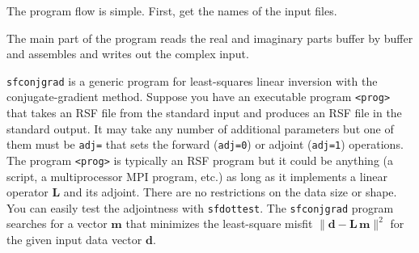 The program flow is simple. First, get the names of the input files.

The main part of the program reads the real and imaginary parts buffer by buffer and assembles and writes out the complex input. 

\noindent\doublebox{\parbox{\textwidth}{
    
}}

\texttt{sfconjgrad} is a generic program for least-squares linear
inversion with the conjugate-gradient method. Suppose you have an
executable program \texttt{<prog>} that takes an RSF file from the
standard input and produces an RSF file in the standard output. It may
take any number of additional parameters but one of them must be
\texttt{adj=} that sets the forward (\texttt{adj=0}) or adjoint
(\texttt{adj=1}) operations.  The program \texttt{<prog>} is typically
an RSF program but it could be anything (a script, a multiprocessor
MPI program, etc.) as long as it implements a linear operator
$\mathbf{L}$ and its adjoint. There are no restrictions on the data
size or shape. You can easily test the adjointness with
\texttt{sfdottest}. The \texttt{sfconjgrad} program searches for a
vector $\mathbf{m}$ that minimizes the least-square misfit 
$\|\mathbf{d - L\,m}\|^2$ for the given input data vector $\mathbf{d}$.

